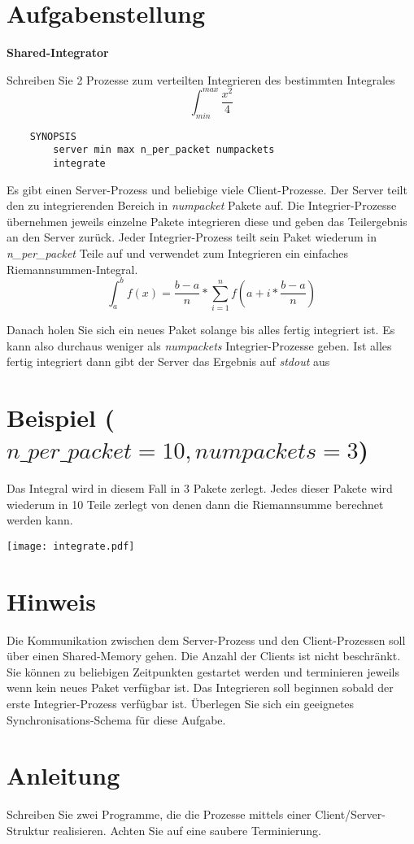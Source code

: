 

\usepackage{graphicx}




\section*{Aufgabenstellung}

\textbf{Shared-Integrator}

Schreiben Sie 2 Prozesse zum verteilten Integrieren des bestimmten Integrales 
$$\int^{max}_{min} \frac{x^2}{4}$$

\begin{verbatim}
    SYNOPSIS
        server min max n_per_packet numpackets
        integrate 
\end{verbatim}

Es gibt einen Server-Prozess und beliebige viele Client-Prozesse. 
Der Server teilt den zu integrierenden Bereich in \emph{numpacket} Pakete auf. 
Die Integrier-Prozesse übernehmen jeweils einzelne Pakete integrieren diese und geben das Teilergebnis an den Server zurück. 
Jeder Integrier-Prozess teilt sein Paket wiederum in \emph{n\_per\_packet} Teile auf und verwendet zum Integrieren ein einfaches Riemannsummen-Integral.
$$\int^b_a f(x) = \frac{b-a}n * \sum_{i=1}^{n} f(a+i*\frac{b-a}{n})$$

Danach holen Sie sich ein neues Paket solange bis alles fertig integriert ist. Es kann also durchaus weniger als \emph{numpackets} Integrier-Prozesse geben. Ist alles fertig integriert dann gibt der Server das Ergebnis auf \emph{stdout} aus

\section*{Beispiel {\small($n\_per\_packet=10, numpackets=3$)}}
Das Integral wird in diesem Fall in 3 Pakete zerlegt.
Jedes dieser Pakete wird wiederum in 10 Teile zerlegt von denen dann die Riemannsumme berechnet werden kann.

\begin{center}
\texttt{[image: integrate.pdf]}
\end{center}

\section*{Hinweis}
Die Kommunikation zwischen dem Server-Prozess und den Client-Prozessen soll über einen Shared-Memory gehen. Die Anzahl der Clients ist nicht beschränkt. Sie können zu beliebigen Zeitpunkten gestartet werden und terminieren jeweils wenn kein neues Paket verfügbar ist. Das Integrieren soll beginnen sobald der erste Integrier-Prozess verfügbar ist. Überlegen Sie sich ein geeignetes Synchronisations-Schema für diese Aufgabe.  

\section*{Anleitung}
Schreiben Sie zwei Programme, die die Prozesse mittels einer Client/Server-Struktur realisieren. Achten Sie auf eine saubere Terminierung.

\osueguidelinesthree


